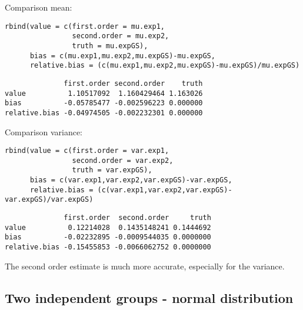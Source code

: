 \documentclass[12pt]{article}
\begin{document}
Comparison mean:
\lstset{language=r,label= ,caption= ,captionpos=b,numbers=none}
\begin{lstlisting}
rbind(value = c(first.order = mu.exp1, 
				second.order = mu.exp2, 
				truth = mu.expGS),
	  bias = c(mu.exp1,mu.exp2,mu.expGS)-mu.expGS,
	  relative.bias = (c(mu.exp1,mu.exp2,mu.expGS)-mu.expGS)/mu.expGS)
\end{lstlisting}

\begin{verbatim}
              first.order second.order    truth
value          1.10517092  1.160429464 1.163026
bias          -0.05785477 -0.002596223 0.000000
relative.bias -0.04974505 -0.002232301 0.000000
\end{verbatim}

Comparison variance:
\lstset{language=r,label= ,caption= ,captionpos=b,numbers=none}
\begin{lstlisting}
rbind(value = c(first.order = var.exp1, 
				second.order = var.exp2, 
				truth = var.expGS),
	  bias = c(var.exp1,var.exp2,var.expGS)-var.expGS,
	  relative.bias = (c(var.exp1,var.exp2,var.expGS)-var.expGS)/var.expGS)
\end{lstlisting}

\begin{verbatim}
              first.order  second.order     truth
value          0.12214028  0.1435148241 0.1444692
bias          -0.02232895 -0.0009544035 0.0000000
relative.bias -0.15455853 -0.0066062752 0.0000000
\end{verbatim}

The second order estimate is much more accurate, especially for the
variance.

\subsection{Two independent groups - normal distribution}
\label{sec:org5cc4d0e}
\end{document}
